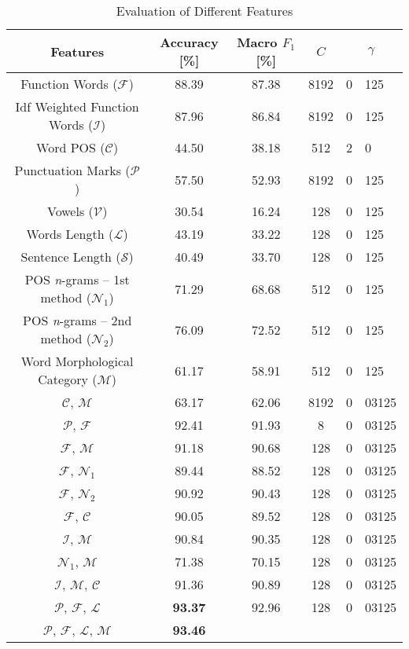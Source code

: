 \documentclass{llncs}
\begin{document}
\begin{table*}[htb]
\begin{center}
\caption{Evaluation of Different Features}%
\begin{tabular}{c c c c r@{.}l}%
\toprule%
Features & Accuracy [\%] & Macro $F_1$ [\%] & $C$ &
\multicolumn{2}{c}{$\gamma$}\\
\midrule
Function Words ($\mathcal{F}$) & 88.39 & 87.38 & 8192 & 0 & 125\\
Idf Weighted Function Words ($\mathcal{I}$) & 87.96 & 86.84 & 8192 & 0 & 125\\
Word POS ($\mathcal{C}$) & 44.50 & 38.18 & 512 & 2 & 0\\
Punctuation Marks ($\mathcal{P}$) & 57.50 & 52.93 & 8192 & 0 & 125\\
Vowels ($\mathcal{V}$) & 30.54 & 16.24 & 128 & 0 & 125\\
Words Length ($\mathcal{L}$) & 43.19 & 33.22 & 128 & 0 & 125\\
Sentence Length ($\mathcal{S}$) & 40.49 & 33.70 & 128 & 0 & 125\\
POS \emph{n}-grams -- 1st method ($\mathcal{N}_1$) & 71.29 &
68.68 & 512 & 0 & 125\\
POS \emph{n}-grams -- 2nd method ($\mathcal{N}_2$) & 76.09
& 72.52 & 512 & 0 & 125\\
Word Morphological Category ($\mathcal{M}$) & 61.17 & 58.91 & 512 & 0 & 125\\
$\mathcal{C}$, $\mathcal{M}$ & 63.17 & 62.06 & 8192 & 0 & 03125\\
$\mathcal{P}$, $\mathcal{F}$ & 92.41 & 91.93 & 8 & 0 & 03125\\
$\mathcal{F}$, $\mathcal{M}$ & 91.18 & 90.68 & 128 & 0 & 03125\\
$\mathcal{F}$, $\mathcal{N}_1$ & 89.44 & 88.52 & 128 & 0 & 03125\\
$\mathcal{F}$, $\mathcal{N}_2$ & 90.92 & 90.43 & 128 & 0 & 03125\\
$\mathcal{F}$, $\mathcal{C}$ & 90.05 & 89.52 & 128 & 0 & 03125\\
$\mathcal{I}$, $\mathcal{M}$ & 90.84 & 90.35 & 128 & 0 & 03125\\
$\mathcal{N}_1$, $\mathcal{M}$ & 71.38 & 70.15 & 128 & 0 & 03125\\
$\mathcal{I}$, $\mathcal{M}$, $\mathcal{C}$ & 91.36 & 90.89 & 128 & 0 & 03125\\
$\mathcal{P}$, $\mathcal{F}$, $\mathcal{L}$ & \textbf{93.37} & 92.96 & 128 & 0 & 03125\\
$\mathcal{P}$, $\mathcal{F}$, $\mathcal{L}$, $\mathcal{M}$ & \textbf{93.46} &

\end{tabular}
\end{center}
\end{table*}
\end{document}
